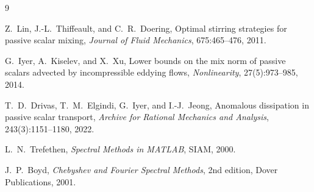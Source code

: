 \documentclass[12pt,a4paper]{article}
\theoremstyle{definition}
\theoremstyle{plain}
\begin{document}

\begin{thebibliography}{9}

Z.~Lin, J.-L.~Thiffeault, and C.~R.~Doering,
\newblock Optimal stirring strategies for passive scalar mixing,
\newblock \emph{Journal of Fluid Mechanics}, 675:465--476, 2011.

G.~Iyer, A.~Kiselev, and X.~Xu,
\newblock Lower bounds on the mix norm of passive scalars advected by
  incompressible eddying flows,
\newblock \emph{Nonlinearity}, 27(5):973--985, 2014.

T.~D.~Drivas, T.~M.~Elgindi, G.~Iyer, and I.-J.~Jeong,
\newblock Anomalous dissipation in passive scalar transport,
\newblock \emph{Archive for Rational Mechanics and Analysis},
  243(3):1151--1180, 2022.

L.~N.~Trefethen,
\newblock \emph{Spectral Methods in MATLAB},
\newblock SIAM, 2000.

J.~P.~Boyd,
\newblock \emph{Chebyshev and Fourier Spectral Methods},
\newblock 2nd edition, Dover Publications, 2001.

\end{thebibliography}
\end{document}
